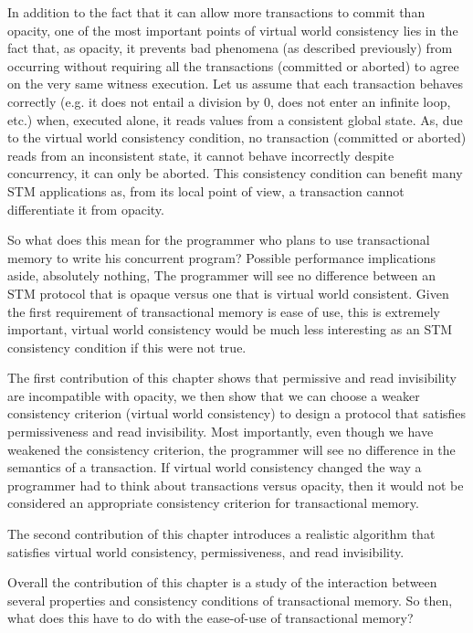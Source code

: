 In addition to the fact that  it can allow more transactions to commit than
opacity,  one of  the most important points  of virtual world  consistency lies 
in   the fact that,  as opacity, it  prevents  bad  phenomena  (as described 
previously)    from occurring  without requiring  all the
transactions  (committed   or  aborted)  to  agree on the very same  witness
execution.  Let  us  assume  that each  transaction  behaves  correctly
(e.g. it does not entail a division  by 0, does not enter an infinite loop,
etc.) when, executed  alone, it  reads  values from  a consistent  global
state.  As, due  to the virtual world consistency  condition, no transaction
(committed or aborted)  reads from an inconsistent state,  it cannot behave
incorrectly despite  concurrency, it can only  be aborted.
This  consistency 
condition  can benefit many  STM applications as, from  its  local point
of view,  a transaction cannot  differentiate it from opacity.

So what does this mean for the programmer who plans to use transactional memory
to write his concurrent program?
Possible performance implications aside, absolutely nothing,
The programmer will see no difference between an STM protocol that is opaque
versus one that is virtual world consistent.
Given the first requirement of transactional memory is ease of use, this is extremely
important, virtual world consistency would be much less interesting as an STM
consistency condition if this were not true.


The first contribution of this chapter shows that permissive and read invisibility are
incompatible with opacity, we then show that we can choose a weaker consistency criterion
(virtual world consistency) to design a protocol that satisfies permissiveness and
read invisibility.
Most importantly, even though we have weakened the consistency criterion, the programmer
will see no difference in the semantics of a transaction.
If virtual world consistency changed the way a programmer had to think about transactions versus opacity,
then it would not be considered an appropriate consistency criterion for transactional memory.

The second contribution of this chapter introduces a realistic algorithm that satisfies
virtual world consistency, permissiveness, and read invisibility.


Overall the contribution of this chapter is a study of the interaction
between several properties and consistency conditions of transactional memory.
So then, what does this have to do with the ease-of-use of 
transactional memory?


